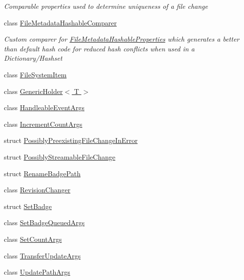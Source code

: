 \begin{DoxyCompactItemize}
\begin{DoxyCompactList}\small\item\em Comparable properties used to determine uniqueness of a file change \end{DoxyCompactList}\item 
class \hyperlink{class_cloud_api_public_1_1_model_1_1_file_metadata_hashable_comparer}{File\-Metadata\-Hashable\-Comparer}
\begin{DoxyCompactList}\small\item\em Custom comparer for \hyperlink{struct_cloud_api_public_1_1_model_1_1_file_metadata_hashable_properties}{File\-Metadata\-Hashable\-Properties} which generates a better than default hash code for reduced hash conflicts when used in a Dictionary/\-Hashset \end{DoxyCompactList}\item 
class \hyperlink{class_cloud_api_public_1_1_model_1_1_file_system_item}{File\-System\-Item}
\item 
class \hyperlink{class_cloud_api_public_1_1_model_1_1_generic_holder_3_01_t_01_4}{Generic\-Holder$<$ T $>$}
\item 
class \hyperlink{class_cloud_api_public_1_1_model_1_1_handleable_event_args}{Handleable\-Event\-Args}
\item 
class \hyperlink{class_cloud_api_public_1_1_model_1_1_increment_count_args}{Increment\-Count\-Args}
\item 
struct \hyperlink{struct_cloud_api_public_1_1_model_1_1_possibly_preexisting_file_change_in_error}{Possibly\-Preexisting\-File\-Change\-In\-Error}
\item 
struct \hyperlink{struct_cloud_api_public_1_1_model_1_1_possibly_streamable_file_change}{Possibly\-Streamable\-File\-Change}
\item 
struct \hyperlink{struct_cloud_api_public_1_1_model_1_1_rename_badge_path}{Rename\-Badge\-Path}
\item 
class \hyperlink{class_cloud_api_public_1_1_model_1_1_revision_changer}{Revision\-Changer}
\item 
struct \hyperlink{struct_cloud_api_public_1_1_model_1_1_set_badge}{Set\-Badge}
\item 
class \hyperlink{class_cloud_api_public_1_1_model_1_1_set_badge_queued_args}{Set\-Badge\-Queued\-Args}
\item 
class \hyperlink{class_cloud_api_public_1_1_model_1_1_set_count_args}{Set\-Count\-Args}
\item 
class \hyperlink{class_cloud_api_public_1_1_model_1_1_transfer_update_args}{Transfer\-Update\-Args}
\item 
class \hyperlink{class_cloud_api_public_1_1_model_1_1_update_path_args}{Update\-Path\-Args}
\end{DoxyCompactItemize}
